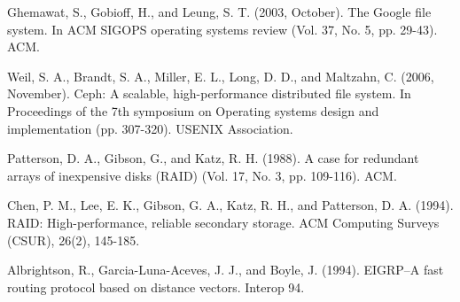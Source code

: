 \documentclass[12pt]{article}
\begin{document}
\begin{thebibliography}{99}
    Ghemawat, S., Gobioff, H., and Leung, S. T. (2003, October). The Google file system. In ACM SIGOPS operating systems review (Vol. 37, No.  5, pp. 29-43). ACM.

    Weil, S. A., Brandt, S. A., Miller, E. L., Long, D. D., and Maltzahn, C. (2006, November). Ceph: A scalable, high-performance distributed file system. In Proceedings of the 7th symposium on Operating systems design and implementation (pp. 307-320). USENIX Association.

    Patterson, D. A., Gibson, G., and Katz, R. H. (1988). A case for redundant arrays of inexpensive disks (RAID) (Vol. 17, No. 3, pp.  109-116). ACM.

    Chen, P. M., Lee, E. K., Gibson, G. A., Katz, R. H., and Patterson, D. A. (1994). RAID: High-performance, reliable secondary storage. ACM Computing Surveys (CSUR), 26(2), 145-185.

    Albrightson, R., Garcia-Luna-Aceves, J. J., and Boyle, J.  (1994). EIGRP--A fast routing protocol based on distance vectors. Interop 94.

 \end{thebibliography}
\end{document}
